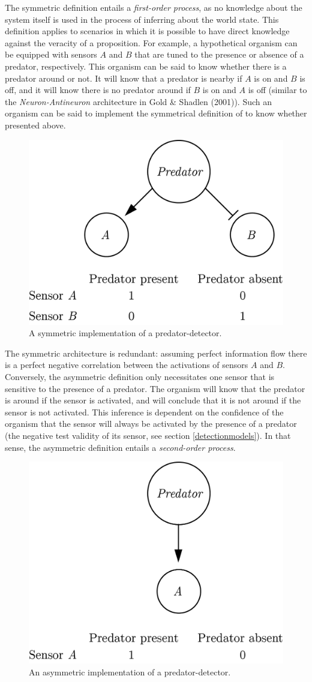\documentclass[12pt,twoside]{reedthesis}
\begin{document}
The symmetric definition entails a \emph{first-order process}, as no knowledge about the system itself is used in the process of inferring about the world state. This definition applies to scenarios in which it is possible to have direct knowledge against the veracity of a proposition. For example, a hypothetical organism can be equipped with sensors \(A\) and \(B\) that are tuned to the presence or absence of a predator, respectively. This organism can be said to know whether there is a predator around or not. It will know that a predator is nearby if \(A\) is on and \(B\) is off, and it will know there is no predator around if \(B\) is on and \(A\) is off (similar to the \emph{Neuron-Antineuron} architecture in Gold \& Shadlen (2001)). Such an organism can be said to implement the symmetrical definition of to know whether presented above.
\begin{figure}
\includegraphics[width=0.5\linewidth]{figure/intro/symmetric} \caption[A symmetric implementation of a predator-detector.]{A symmetric implementation of a predator-detector.}\label{fig:intro-symmetric}
\end{figure}
The symmetric architecture is redundant: assuming perfect information flow there is a perfect negative correlation between the activations of sensors \(A\) and \(B\). Conversely, the asymmetric definition only necessitates one sensor that is sensitive to the presence of a predator. The organism will know that the predator is around if the sensor is activated, and will conclude that it is not around if the sensor is not activated. This inference is dependent on the confidence of the organism that the sensor will always be activated by the presence of a predator (the negative test validity of its sensor, see section \ref{detectionmodels}). In that sense, the asymmetric definition entails a \emph{second-order process}.
\begin{figure}
\includegraphics[width=0.5\linewidth]{figure/intro/asymmetric} \caption[An asymmetric implementation of a predator-detector.]{An asymmetric implementation of a predator-detector.}\label{fig:intro-asymmetric}
\end{figure}
\end{document}
